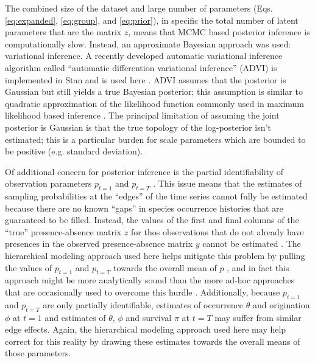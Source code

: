 \documentclass[12pt,letterpaper]{article}
\begin{document}

The combined size of the dataset and large number of parameters (Eqs. \ref{eq:expanded}, \ref{eq:group}, and \ref{eq:prior}), in specific the total number of latent parameters that are the matrix \(z\), means that MCMC based posterior inference is computationally slow. Instead, an approximate Bayesian approach was used: variational inference. A recently developed automatic variational inference algorithm called ``automatic differention variational inference'' (ADVI) is implemented in Stan and is used here \citep{Kucukelbir2015,StanDevelopmentTeam2016}. ADVI assumes that the posterior is Gaussian but still yields a true Bayesian posterior; this assumption is similar to quadratic approximation of the likelihood function commonly used in maximum likelihood based inference \citep{McElreath2016}. The principal limitation of assuming the joint posterior is Gaussian is that the true topology of the log-posterior isn't estimated; this is a particular burden for scale parameters which are bounded to be positive (e.g. standard deviation).

Of additional concern for posterior inference is the partial identifiability of observation parameters \(p_{t = 1}\) and \(p_{t = T}\) \citep{Royle2008}. This issue means that the estimates of sampling probabilities at the ``edges'' of the time series cannot fully be estimated because there are no known ``gaps'' in species occurrence histories that are guaranteed to be filled. Instead, the values of the first and final columns of the ``true'' presence-absence matrix \(z\) for thos observations that do not already have presences in the observed presence-absence matrix \(y\) cannot be estimated \citep{Royle2008}. The hierarchical modeling approach used here helps mitigate this problem by pulling the values of \(p_{t = 1}\) and \(p_{t = T}\) towards the overall mean of \(p\) \citep{Gelman2013d}, and in fact this approach might be more analytically sound than the more ad-hoc approaches that are occasionally used to overcome this hurdle \citep{Royle2008}. Additionally, because \(p_{t = 1}\) and \(p_{t = T}\) are only partially identifiable, estimates of occurrence \(\theta\) and origination \(\phi\) at \(t = 1\) and estimates of \(\theta\), \(\phi\) and survival \(\pi\) at \(t = T\) may suffer from similar edge effects. Again, the hierarchical modeling approach used here may help correct for this reality by drawing these estimates towards the overall means of those parameters.
\end{document}
